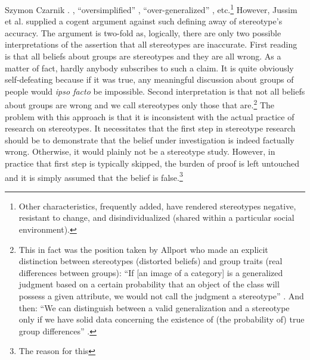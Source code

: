 \begin{artengenv}{Szymon Czarnik}
{%
\parencite[][p.16]{miller_expectancies_1986}.%
}, ``oversimplified'' 
\parencite[][]{koleser_stereotyping_2008}, %
 ``over-generalized'' 
\parencite[][]{wikipedia_stereotype_2020}, %
 etc.\footnote{Other characteristics, frequently added, have rendered stereotypes negative, resistant to change, and disindividualized (shared within a particular social environment).} However, Jussim et al. 
\enlargethispage{-.5\baselineskip}%
\parencite*[][]{jussim_unbearable_2009} %
 supplied a cogent argument against such defining away of stereotype's accuracy. The argument is two-fold as, logically, there are only two possible interpretations of the assertion that all stereotypes are inaccurate. First reading is that all beliefs about groups are stereotypes and they are all wrong. As a matter of fact, hardly anybody subscribes to such a claim. It is quite obviously self-defeating because if it was true, any meaningful discussion about groups of people would \textit{ipso facto} be impossible. Second interpretation is that not all beliefs about groups are wrong and we call stereotypes only those that are.\footnote{This in fact was the position taken by Allport who made an explicit distinction between stereotypes (distorted beliefs) and group traits (real differences between groups): ``If [an image of a category] is a generalized judgment based on a certain probability that an object of the class will possess a given attribute, we would not call the judgment a stereotype'' 
\parencite[][p.189]{allport_nature_1954}. %
 And then: ``We can distinguish between a valid generalization and a stereotype only if we have solid data concerning the existence of (the probability of) true group differences'' 
\parencite[][p.192]{allport_nature_1954}.}
 The problem with this approach is that it is inconsistent with the actual practice of research on stereotypes. It necessitates that the first step in stereotype research should be to demonstrate that the belief under investigation is indeed factually wrong. Otherwise, it would plainly not be a stereotype study. However, in practice that first step is typically skipped, the burden of proof is left untouched and it is simply assumed that the belief is false.\footnote{The reason for this
}
\end{artengenv}
